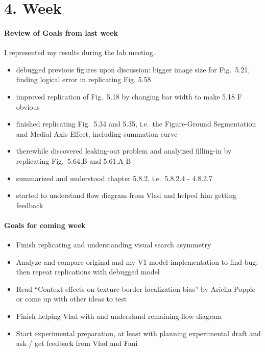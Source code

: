 \section*{4. Week}

\paragraph{Review of Goals from last week}
I represented my results during the lab meeting.
\begin{itemize}
	\item debugged previous figures upon discussion: bigger image size for Fig.\ 5.21, finding logical error in replicating Fig. 5.58 \cite{zhaoping_understanding_2014}
	\item improved replication of Fig.\ 5.18 by changing bar width to make 5.18 F obvious \cite{zhaoping_understanding_2014} 
	\item finished replicating  Fig.\ 5.34 and 5.35, i.e.\ the Figure-Ground Segmentation and Medial Axis Effect, including summation curve \cite{zhaoping_understanding_2014}
	\item therewhile discovered leaking-out problem and analyized filling-in by replicating Fig.\ 5.64.B and 5.61.A-B \cite{zhaoping_understanding_2014}
	\item summarized and understood chapter 5.8.2, i.e.\ 5.8.2.4 - 4.8.2.7 \cite{zhaoping_understanding_2014}
	\item started to understand flow diagram from Vlad and helped him getting feedback
\end{itemize}

\paragraph{Goals for coming week}
\begin{itemize}
	\item Finish replicating and understanding visual search asymmetry 
	\item Analyze and compare original and my V1 model implementation to
	find bug; then repeat replications with debugged model
	\item Read “Context effects on texture border localization bias” by Ariella 
	Popple or come up with other ideas to test
	\item Finish helping Vlad with and understand remaining flow diagram
	\item Start experimental preparation, at least with planning experimental 
	draft and ask / get feedback from Vlad and Fani
\end{itemize}

